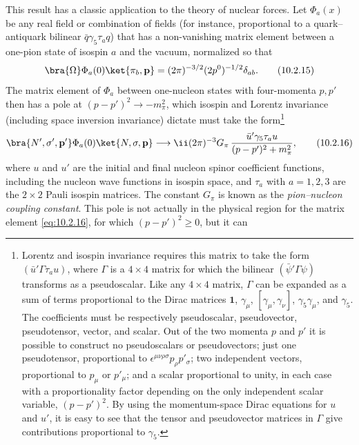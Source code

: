This result has a classic application to the theory of nuclear forces. Let
$\Phi_a(x)$ be any real field or combination of fields (for instance, proportional
to a quark--antiquark bilinear $\bar q\gamma_5\tau_a q$) that has a non-vanishing matrix
element between a one-pion state of isospin $a$ and the vacuum, normalized
so that
\begin{equation}
  \bra{\Omega}\Phi_a(0)\ket{\pi_b,\mathbf p}
  =(2\pi)^{-3/2}(2p^0)^{-1/2}\delta_{ab}.
  \tag{10.2.15}\label{eq:10.2.15}
\end{equation}
The matrix element of $\Phi_a$ between one-nucleon states with four-momenta
$p,p'$ then has a pole at $(p-p')^2\to-m_\pi^2$, which isospin and Lorentz
invariance (including space inversion invariance) dictate must take the
form\footnote{Lorentz and isospin invariance requires this matrix to take the form
$(\bar u'\Gamma\tau_a u)$, where $\Gamma$ is a $4\times4$ matrix for which the bilinear
$(\bar\psi'\Gamma\psi)$ transforms as a pseudoscalar. Like any $4\times4$ matrix, $\Gamma$ can
be expanded as a sum of terms proportional to the Dirac matrices $\mathbf{1}$, $\gamma_\mu$,
$[\gamma_\mu,\gamma_\nu]$, $\gamma_5\gamma_\mu$, and $\gamma_5$. The coefficients must be respectively
pseudoscalar, pseudovector, pseudotensor, vector, and scalar. Out of the two momenta
$p$ and $p'$ it is possible to construct no pseudoscalars or pseudovectors; just one
pseudotensor, proportional to $\epsilon^{\mu\nu\rho\sigma}p_\rho p'_\sigma$; two independent vectors,
proportional to $p_\mu$ or $p'_\mu$; and a scalar proportional to unity, in each case with a
proportionality factor depending on the only independent scalar variable, $(p-p')^2$.
By using the momentum-space Dirac equations for $u$ and $u'$, it is easy to see that
the tensor and pseudovector matrices in $\Gamma$ give contributions proportional to $\gamma_5$.}
\begin{equation}
  \bra{N',\sigma',\mathbf p'}\Phi_a(0)\ket{N,\sigma,\mathbf p}
  \longrightarrow \ii(2\pi)^{-3}G_\pi\,
  \frac{\bar u'\gamma_5\tau_a u}{(p-p')^2+m_\pi^2},
  \tag{10.2.16}\label{eq:10.2.16}
\end{equation}
where $u$ and $u'$ are the initial and final nucleon spinor coefficient functions,
including the nucleon wave functions in isospin space, and $\tau_a$ with $a=
1,2,3$ are the $2\times2$ Pauli isospin matrices. The constant $G_\pi$ is known as the
\textit{pion--nucleon coupling constant}. This pole is not actually in the physical
region for the matrix element \eqref{eq:10.2.16}, for which $(p-p')^2\geq0$, but it can
